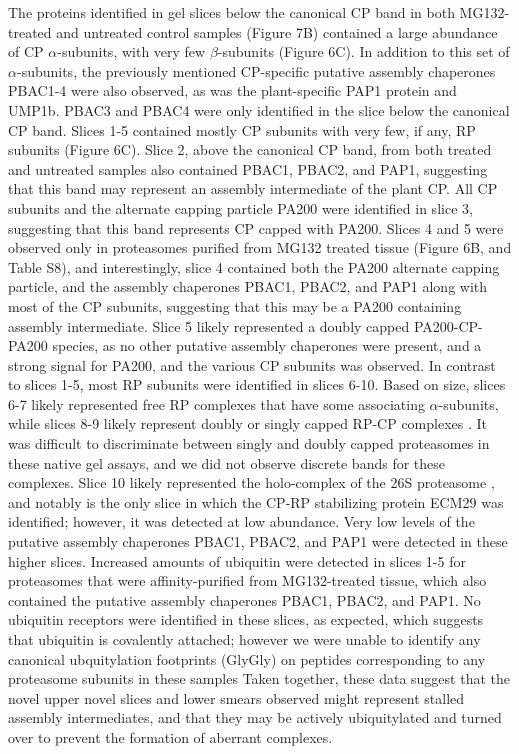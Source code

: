 The proteins identified in gel slices below the canonical CP band in both MG132-treated and untreated control samples (Figure 7B) contained a large abundance of CP $\alpha$-subunits, with very few $\beta$-subunits (Figure 6C). In addition to this set of $\alpha$-subunits, the previously mentioned CP-specific putative assembly chaperones PBAC1-4 were also observed, as was the plant-specific PAP1 protein and UMP1b. PBAC3 and PBAC4 were only identified in the slice below the canonical CP band. Slices 1-5 contained mostly CP subunits with very few, if any, RP subunits (Figure 6C). Slice 2, above the canonical CP band, from both treated and untreated samples also contained PBAC1, PBAC2, and PAP1, suggesting that this band may represent an assembly intermediate of the plant CP. All CP subunits and the alternate capping particle PA200 were identified in slice 3, suggesting that this band represents CP capped with PA200. Slices 4 and 5 were observed only in proteasomes purified from MG132 treated tissue (Figure 6B, and Table S8), and interestingly, slice 4 contained both the PA200 alternate capping particle, and the assembly chaperones PBAC1, PBAC2, and PAP1 along with most of the CP subunits, suggesting that this may be a PA200 containing assembly intermediate. Slice 5 likely represented a doubly capped PA200-CP-PA200 species, as no other putative assembly chaperones were present, and a strong signal for PA200, and the various CP subunits was observed. 
In contrast to slices 1-5, most RP subunits were identified in slices 6-10. Based on size, slices 6-7 likely represented free RP complexes that have some associating $\alpha$-subunits, while slices 8-9 likely represent doubly or singly capped RP-CP complexes \citep{book10}. It was difficult to discriminate between singly and doubly capped proteasomes in these native gel assays, and we did not observe discrete bands for these complexes. Slice 10 likely represented the holo-complex of the 26S proteasome \citep{book10}, and notably is the only slice in which the CP-RP stabilizing protein ECM29 was identified; however, it was detected at low abundance. Very low levels of the putative assembly chaperones PBAC1, PBAC2, and PAP1 were detected in these higher slices. Increased amounts of ubiquitin were detected in slices 1-5 for proteasomes that were affinity-purified from MG132-treated tissue, which also contained the putative assembly chaperones PBAC1, PBAC2, and PAP1. No ubiquitin receptors were identified in these slices, as expected, which suggests that ubiquitin is covalently attached; however we were unable to identify any canonical ubquitylation footprints (GlyGly) \citep{wang06} on peptides corresponding to any proteasome subunits in these samples  Taken together, these data suggest that the novel upper novel slices and lower smears observed might represent stalled assembly intermediates, and that they may be actively ubiquitylated and turned over to prevent the formation of aberrant complexes.
 
